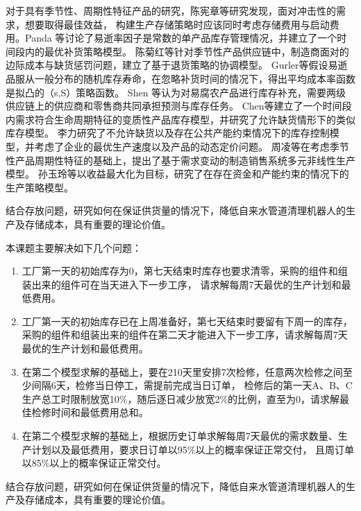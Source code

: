 对于具有季节性、周期性特征产品的研究，陈宪章等\cite{陈宪章2004冲击型负荷下的生产存储模型研究}研究发现，面对冲击性的需求，想要取得最佳效益，
构建生产存储策略时应该同时考虑存储费用与启动费用。Panda 等\cite{panda2008optimal}讨论了易逝率因子是常数的单产品库存管理情况，并建立了一个时间段内的最优补货策略模型。
陈菊红等\cite{陈菊红2010受资源限制且带有缺货惩罚的季节性产品供应链协调}针对季节性产品供应链中，制造商面对的边际成本与缺货惩罚问题，建立了基于退货策略的协调模型。
Gurler等\cite{gurler2008analysis}假设易逝品服从一般分布的随机库存寿命，在忽略补货时间的情况下，得出平均成本率函数是拟凸的（s,S）策略函数。
Shen 等\cite{shen2011modelling}认为对易腐农产品进行库存补充，需要两级供应链上的供应商和零售商共同承担预测与库存任务。
Chen等\cite{chen2007net}建立了一个时间段内需求符合生命周期特征的变质性产品库存模型，并研究了允许缺货情形下的类似库存模型。
李力\cite{李力2015多种易逝品的库存控制模型及动态定价}研究了不允许缺货以及存在公共产能约束情况下的库存控制模型，并考虑了企业的最优生产速度以及产品的动态定价问题。
周凌等\cite{周凌2014基于柔性产能的季节性产品生产决策模型}在考虑季节性产品周期性特征的基础上，提出了基于需求变动的制造销售系统多元非线性生产模型。
孙玉玲等\cite{孙玉玲2009考虑能力约束的易逝品生产策略}以收益最大化为目标，研究了在存在资金和产能约束的情况下的生产策略模型。

结合存放问题，研究如何在保证供货量的情况下，降低自来水管道清理机器人的生产及存储成本，具有重要的理论价值。

本课题主要解决如下几个问题：
\begin{enumerate}
  \item 工厂第一天的初始库存为0，第七天结束时库存也要求清零，采购的组件和组装出来的组件可在当天进入下一步工序，
  请求解每周7天最优的生产计划和最低费用。
  \item 工厂第一天的初始库存已在上周准备好，第七天结束时要留有下周一的库存，
  采购的组件和组装出来的组件在第二天才能进入下一步工序，请求解每周7天最优的生产计划和最低费用。
  \item 在第二个模型求解的基础上，要在210天里安排7次检修，任意两次检修之间至少间隔6天，检修当日停工，需提前完成当日订单，
  检修后的第一天A、B、C生产总工时限制放宽10\%，随后逐日减少放宽2\%的比例，直至为0，请求解最佳检修时间和最低费用总和。
  \item 在第二个模型求解的基础上，根据历史订单求解每周7天最优的需求数量、生产计划以及最低费用，要求日订单以95\%以上的概率保证正常交付，
  且周订单以85\%以上的概率保证正常交付。
\end{enumerate}

结合存放问题，研究如何在保证供货量的情况下，降低自来水管道清理机器人的生产及存储成本，具有重要的理论价值。